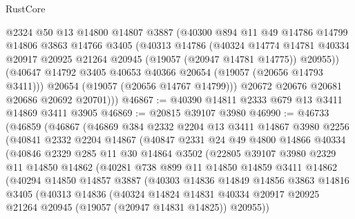 \begin{lexlean}{RustCore}
\begin{coremodule}
          @2324
          @50
          @13
          @14800
          @14807
          @3887
          (@40300
            @894
            @11
            @49
            @14786
            @14799
            @14806
            @3863
            @14766
            @3405
            (@40313
              @14786
              (@40324
                @14774
                @14781
                @40334
                @20917
                @20925
                @21264
                @20945
                (@19057 (@20947 @14781 @14775))
                @20955))
            (@40647 @14792 @3405 @40653 @40366 @20654 (@19057 (@20656 @14793 @3411)))
            @20654
            (@19057 (@20656 @14767 @14799)))
          @20672
          @20676
          @20681
          @20686
          @20692
          @20701)))
@46867 := @40390 @14811 @2333 @679 @13 @3411 @14869 @3411 @3905
@46869 := @20815 @39107 @3980
@46990 := @46733
    (@46859
      (@46867
        (@46869
          @384
          @2332
          @2204
          @13
          @3411
          @14867
          @3980
          @2256
          (@40841
            @2332
            @2204
            @14867
            (@40847
              @2331
              @24
              @49
              @4800
              @14866
              @40334
              (@40846
                @2329
                @285
                @11
                @30
                @14864
                @3502
                (@22805
                  @39107
                  @3980
                  @2329
                  @11
                  @14850
                  @14862
                  (@40281
                    @738
                    @899
                    @11
                    @14850
                    @14859
                    @3411
                    @14862
                    (@40294
                      @14850
                      @14857
                      @3887
                      (@40303
                        @14836
                        @14849
                        @14856
                        @3863
                        @14816
                        @3405
                        (@40313
                          @14836
                          (@40324
                            @14824
                            @14831
                            @40334
                            @20917
                            @20925
                            @21264
                            @20945
                            (@19057 (@20947 @14831 @14825))
                            @20955))

\end{coremodule}
\end{lexlean}
